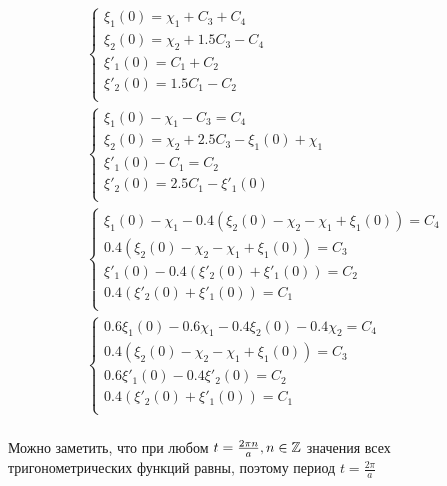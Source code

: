 \begin{align*}
     & \begin{cases}
        \xi_1(0)   = \chi_1 + C_3 + C_4   \\
        \xi_2(0)  = \chi_2 + 1.5C_3 - C_4 \\
        \xi'_1(0)  = C_1 + C_2            \\
        \xi'_2(0)  = 1.5C_1 - C_2         \\
    \end{cases} \\
     & \begin{cases}
        \xi_1(0) - \chi_1 - C_3 = C_4                  \\
        \xi_2(0) = \chi_2 + 2.5C_3 - \xi_1(0) + \chi_1 \\
        \xi'_1(0) - C_1 = C_2                          \\
        \xi'_2(0) = 2.5C_1 - \xi'_1(0)                 \\
    \end{cases} \\
     & \begin{cases}
        \xi_1(0) - \chi_1 - 0.4(\xi_2(0) - \chi_2 - \chi_1 + \xi_1(0)) = C_4 \\
        0.4(\xi_2(0) - \chi_2 - \chi_1 + \xi_1(0)) = C_3                     \\
        \xi'_1(0) - 0.4(\xi'_2(0) + \xi'_1(0)) = C_2                         \\
        0.4(\xi'_2(0) + \xi'_1(0)) = C_1\,                                   \\
    \end{cases} \\
     & \begin{cases}
        0.6\xi_1(0) - 0.6\chi_1 - 0.4\xi_2(0) - 0.4\chi_2 = C_4 \\
        0.4(\xi_2(0) - \chi_2 - \chi_1 + \xi_1(0)) = C_3        \\
        0.6\xi'_1(0) - 0.4\xi'_2(0) = C_2                       \\
        0.4(\xi'_2(0) + \xi'_1(0)) = C_1                        \\
    \end{cases} \\
\end{align*}

Можно заметить, что при любом \(t = \frac{2\pi n}{a}, n\in\mathbb{Z}\) значения всех тригонометрических функций равны, поэтому период \(t = \frac{2\pi}{a}\)

